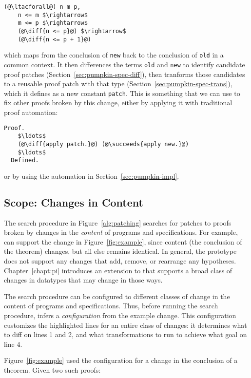 \begin{lstlisting}[language=coq]
  (@\ltacforall@) n m p,
    n <= m $\rightarrow$
    m <= p $\rightarrow$
    (@\diff{n <= p}@) $\rightarrow$
    (@\diff{n <= p + 1}@)
\end{lstlisting}
which maps from the conclusion of \lstinline{new} back to the conclusion of \lstinline{old} in a common context.
It then differences the terms \lstinline{old} and \lstinline{new} to identify candidate proof patches (Section~\ref{sec:pumpkin-spec-diff}),
then tranforms those candidates to a reusable proof patch with that type (Section~\ref{sec:pumpkin-spec-trans}),
which it defines as a new constant \lstinline{patch}.
This is something that we can use to fix other proofs broken by this change, either by applying it with traditional proof automation:

\begin{lstlisting}[language=coq]
  Proof.
    $\ldots$
    (@\diff{apply patch.}@) (@\succeeds{apply new.}@)
    $\ldots$
  Defined.
\end{lstlisting}
or by using the automation in Section~\ref{sec:pumpkin-impl}.

\subsection{Scope: Changes in Content}
\label{sec:pumpkin-scope}

The search procedure in Figure~\ref{alg:patching} searches for patches to proofs broken by changes in the \textit{content} of programs and specifications.
For example, \sysname can support the change in Figure~\ref{fig:example}, since content (the conclusion of the theorem) changes,
but all else remains identical.
In general, the \sysname prototype does not support any changes that add, remove, or rearrange any hypotheses.
Chapter~\ref{chapt:pi} introduces an extension to \sysname that supports a broad class of
changes in datatypes that may change in those ways.

The search procedure can be configured to different classes of change in the content of programs and specifications.
Thus, before running the search procedure, \sysname infers a \textit{configuration} from the example change.
This configuration customizes the highlighted lines for an entire class of changes:
it determines what to diff on lines 1 and 2,
and what transformations to run to achieve what goal on line 4.

Figure~\ref{fig:example} used the configuration for a change in the conclusion of a theorem.
Given two such proofs:

